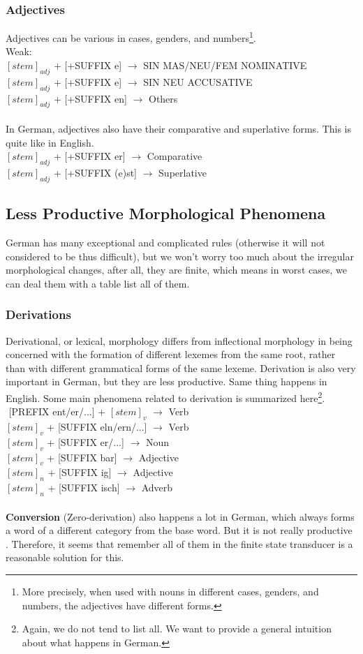 \documentclass[11pt,letterpaper]{article}
\begin{document}
\subsubsection{Adjectives}
Adjectives can be various in cases, genders, and numbers\footnote{More precisely, when used with nouns in different cases, genders, and numbers, the adjectives have different forms.}.\\
Weak:\\
$[stem]_{adj}$ + [+SUFFIX e] $\rightarrow$ SIN MAS/NEU/FEM NOMINATIVE\\
$[stem]_{adj}$ + [+SUFFIX e] $\rightarrow$ SIN NEU ACCUSATIVE\\
$[stem]_{adj}$ + [+SUFFIX en] $\rightarrow$ Others\\\\
In German, adjectives also have their comparative and superlative forms. This is quite like in English.\\
$[stem]_{adj}$ + [+SUFFIX er] $\rightarrow$ Comparative\\
$[stem]_{adj}$ + [+SUFFIX (e)st] $\rightarrow$ Superlative\\

\subsection{Less Productive Morphological Phenomena}
German has many exceptional and complicated rules (otherwise it will not considered to be thus difficult), but we won't worry too much about the irregular morphological changes, after all, they are finite, which means in worst cases, we can deal them with a table list all of them.


\subsubsection{Derivations}
Derivational, or lexical, morphology differs from inflectional morphology in being concerned with the formation of different lexemes from the same root, rather than with different grammatical forms of the same lexeme. Derivation is also very important in German, but they are less productive. Same thing happens in English. Some main phenomena related to derivation is summarized here\footnote{Again, we do not tend to list all. We want to provide a general intuition about what happens in German.}.\\
$ $ [PREFIX ent/er/...] + $[stem]_v$ $\rightarrow$ Verb\\
$[stem]_v$ + [SUFFIX eln/ern/...] $\rightarrow$ Verb\\
$[stem]_v$ + [SUFFIX er/...] $\rightarrow$ Noun\\
$[stem]_v$ + [SUFFIX bar] $\rightarrow$ Adjective\\
$[stem]_n$ + [SUFFIX ig] $\rightarrow$ Adjective\\
$[stem]_n$ + [SUFFIX isch] $\rightarrow$ Adverb\\\\
{\bf Conversion} (Zero-derivation) also happens a lot in German, which always forms a word of a different category from the base word. But it is not really productive \citep{glli}. Therefore, it seems that remember all of them in the finite state transducer is a reasonable solution for this.
\end{document}
